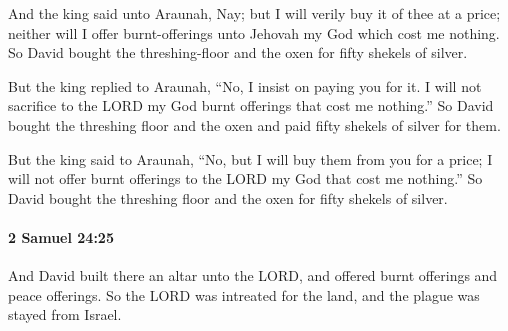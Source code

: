 			\begin{versebox}
					\item[BHS] 
					\item[ASV] And the king said unto Araunah, Nay; but I will verily buy it of thee at a price; neither will I offer burnt-offerings unto Jehovah my God which cost me nothing. So David bought the threshing-floor and the oxen for fifty shekels of silver.
					\item[NIV] But the king replied to Araunah, “No, I insist on paying you for it. I will not sacrifice to the LORD my God burnt offerings that cost me nothing.” So David bought the threshing floor and the oxen and paid fifty shekels of silver for them.
					\item[NRSV] But the king said to Araunah, “No, but I will buy them from you for a price; I will not offer burnt offerings to the LORD my God that cost me nothing.” So David bought the threshing floor and the oxen for fifty shekels of silver.
			\end{versebox}

		\paragraph{2 Samuel 24:25} %
			\label{2SAMUEL-24-25}

			And David built there an altar unto the LORD, and offered burnt offerings and peace offerings. So the LORD was intreated for the land, and the plague was stayed from Israel.

